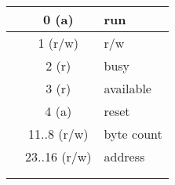 \documentclass[landscape,margin=3pt,pstricks]{standalone}
\begin{document}
\begin{tabular}{|c|c|*{32}{c|}}
 & 0 (a) &  \multicolumn{32}{|l|}{run} \\ \hline
 & 1 (r/w) &  \multicolumn{32}{|l|}{r/w} \\ \hline
 & 2 (r) &  \multicolumn{32}{|l|}{busy} \\ \hline
 & 3 (r) &  \multicolumn{32}{|l|}{available} \\ \hline
 & 4 (a) &  \multicolumn{32}{|l|}{reset} \\ \hline
 & 11..8 (r/w) &  \multicolumn{32}{|l|}{byte count} \\ \hline
 & 23..16 (r/w) &  \multicolumn{32}{|l|}{address} \\ \hline
 &  &  \multicolumn{32}{|l|}{} \\ \hline
 &  &  \multicolumn{32}{|l|}{} \\ \hline
  \hline
\end{tabular}
\end{document}
